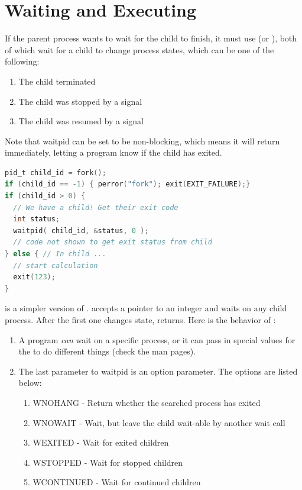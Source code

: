\section{Waiting and Executing}
\label{sec:waiting_and_executing}

If the parent process wants to wait for the child to finish, it must use  (or ), both of which wait for a child to change process states, which can be one of the following:

\begin{enumerate}
\item The child terminated
\item The child was stopped by a signal
\item The child was resumed by a signal
\end{enumerate}

Note that waitpid can be set to be non-blocking, which means it will return immediately, letting a program know if the child has exited.

\begin{lstlisting}[language=C]
pid_t child_id = fork();
if (child_id == -1) { perror("fork"); exit(EXIT_FAILURE);}
if (child_id > 0) {
  // We have a child! Get their exit code
  int status;
  waitpid( child_id, &status, 0 );
  // code not shown to get exit status from child
} else { // In child ...
  // start calculation
  exit(123);
}
\end{lstlisting}

 is a simpler version of .
 accepts a pointer to an integer and waits on any child process.
After the first one changes state,  returns.
Here is the behavior of :

\begin{enumerate}
\item A program \emph{can} wait on a specific process, or it can pass in special values for the  to do different things (check the man pages).
\item The last parameter to waitpid is an option parameter.
The options are listed below:
  \begin{enumerate}
      \item WNOHANG - Return whether the searched process has exited
      \item WNOWAIT - Wait, but leave the child wait-able by another wait call
      \item WEXITED - Wait for exited children
      \item WSTOPPED - Wait for stopped children
      \item WCONTINUED - Wait for continued children
  \end{enumerate}
\end{enumerate}

